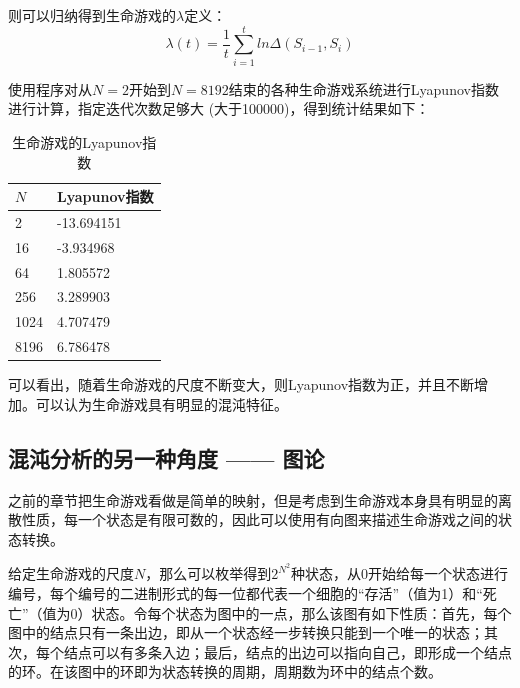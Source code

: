 \documentclass[a4paper,12pt]{article}
\begin{document}
则可以归纳得到生命游戏的$\lambda$定义：
\begin{equation}\label{eq:lyapunov}
\lambda(t) = \frac{1}{t} \sum_{i=1}^{t} ln\Delta(S_{i-1},S_i)
\end{equation}

使用程序对从$N=2$开始到$N=8192$结束的各种生命游戏系统进行Lyapunov指数进行计算，指定迭代次数足够大 (大于100000)，得到统计结果如下：

\singlespacing
{}
\onehalfspacing

\begin{table}[!ht]
\centering
\begin{tabular}{|l|l|}
	\hline
	$N$  & Lyapunov指数 \\ \hline
	2    & -13.694151 \\ \hline
	16   & -3.934968  \\ \hline
	64   & 1.805572   \\ \hline
	256  & 3.289903   \\ \hline
	1024 & 4.707479   \\ \hline
	8196 & 6.786478   \\ \hline
\end{tabular}
\label{table:lyapunov}
\caption{生命游戏的Lyapunov指数}
\end{table}

可以看出，随着生命游戏的尺度不断变大，则Lyapunov指数为正，并且不断增加。可以认为生命游戏具有明显的混沌特征。

\subsection{混沌分析的另一种角度 —— 图论}

之前的章节把生命游戏看做是简单的映射，但是考虑到生命游戏本身具有明显的离散性质，每一个状态是有限可数的，因此可以使用有向图来描述生命游戏之间的状态转换。

给定生命游戏的尺度$N$，那么可以枚举得到$2^{N^2}$种状态，从0开始给每一个状态进行编号，每个编号的二进制形式的每一位都代表一个细胞的“存活”（值为1）和“死亡”（值为0）状态。令每个状态为图中的一点，那么该图有如下性质：首先，每个图中的结点只有一条出边，即从一个状态经一步转换只能到一个唯一的状态；其次，每个结点可以有多条入边；最后，结点的出边可以指向自己，即形成一个结点的环。在该图中的环即为状态转换的周期，周期数为环中的结点个数。
\end{document}
